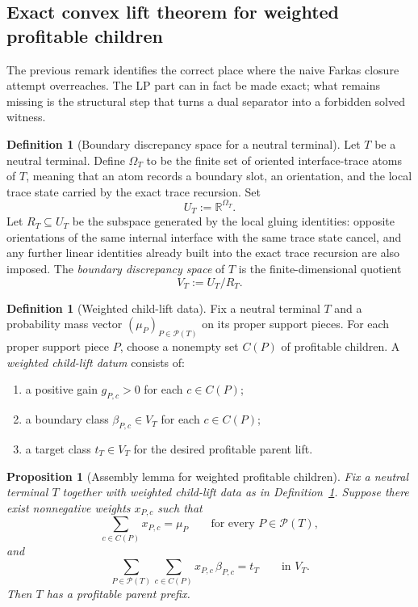 \documentclass[11pt]{article}
\newtheorem{proposition}[theorem]{Proposition}
\theoremstyle{definition}
\newtheorem{definition}[theorem]{Definition}
\newcommand{\R}{\mathbb{R}}
\newcommand{\1}{\mathbf{1}}
\begin{document}
\subsection*{Exact convex lift theorem for weighted profitable children}
The previous remark identifies the correct place where the naive Farkas closure attempt overreaches.
The LP part can in fact be made exact; what remains missing is the structural step that turns a dual separator into a forbidden solved witness.

\begin{definition}[Boundary discrepancy space for a neutral terminal]\label{def:boundary-space}
Let $T$ be a neutral terminal.
Define $\Omega_T$ to be the finite set of oriented interface-trace atoms of $T$, meaning that an atom records a boundary slot, an orientation, and the local trace state carried by the exact trace recursion.
Set
\[
U_T:=\R^{\Omega_T}.
\]
Let $R_T\subseteq U_T$ be the subspace generated by the local gluing identities:
opposite orientations of the same internal interface with the same trace state cancel, and any further linear identities already built into the exact trace recursion are also imposed.
The \emph{boundary discrepancy space} of $T$ is the finite-dimensional quotient
\[
V_T:=U_T/R_T.
\]
\end{definition}

\begin{definition}[Weighted child-lift data]\label{def:weighted-child-lift}
Fix a neutral terminal $T$ and a probability mass vector $(\mu_P)_{P\in \mathcal P(T)}$ on its proper support pieces.
For each proper support piece $P$, choose a nonempty set $C(P)$ of profitable children.
A \emph{weighted child-lift datum} consists of:
\begin{enumerate}[label=(\roman*),leftmargin=2.2em]
\item a positive gain $g_{P,c}>0$ for each $c\in C(P)$;
\item a boundary class $\beta_{P,c}\in V_T$ for each $c\in C(P)$;
\item a target class $t_T\in V_T$ for the desired profitable parent lift.
\end{enumerate}
\end{definition}

\begin{proposition}[Assembly lemma for weighted profitable children]\label{prop:assembly-weighted-children}
Fix a neutral terminal $T$ together with weighted child-lift data as in Definition~\ref{def:weighted-child-lift}.
Suppose there exist nonnegative weights $x_{P,c}$ such that
\[
\sum_{c\in C(P)} x_{P,c}=\mu_P
\qquad\text{for every }P\in \mathcal P(T),
\]
and
\[
\sum_{P\in \mathcal P(T)}\sum_{c\in C(P)} x_{P,c}\,\beta_{P,c}=t_T
\qquad\text{in }V_T.
\]
Then $T$ has a profitable parent prefix.
\end{proposition}
\end{document}
